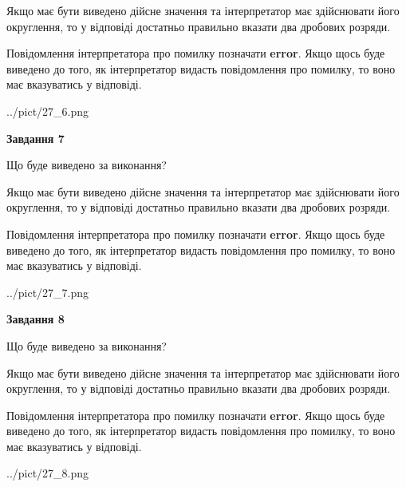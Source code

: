 \documentclass[12pt, ukrainian]{article}
\begin{document}
{\begin {Large}
Якщо має бути виведено дійсне значення та інтерпретатор має здійснювати його округлення, 
то у відповіді достатньо правильно вказати два дробових розряди.

Повідомлення інтерпретатора про помилку позначати \textbf{error}.
Якщо щось буде виведено до того, як інтерпретатор видасть повідомлення про помилку, 
то воно має вказуватись у відповіді. \par

\begin{center}
	{../pict/27_6.png}
\end{center}
\newpage

{\begin {center}\textbf{Завдання 7}\end {center}}\par
Що буде виведено за виконання? \par

Якщо має бути виведено дійсне значення та інтерпретатор має здійснювати його округлення, 
то у відповіді достатньо правильно вказати два дробових розряди.

Повідомлення інтерпретатора про помилку позначати \textbf{error}.
Якщо щось буде виведено до того, як інтерпретатор видасть повідомлення про помилку, 
то воно має вказуватись у відповіді. \par

\begin{center}
	{../pict/27_7.png}
\end{center}
\newpage

{\begin {center}\textbf{Завдання 8}\end {center}}\par
Що буде виведено за виконання? \par

Якщо має бути виведено дійсне значення та інтерпретатор має здійснювати його округлення, 
то у відповіді достатньо правильно вказати два дробових розряди.

Повідомлення інтерпретатора про помилку позначати \textbf{error}.
Якщо щось буде виведено до того, як інтерпретатор видасть повідомлення про помилку, 
то воно має вказуватись у відповіді. \par

\begin{center}
	{../pict/27_8.png}
\end{center}
\newpage


\end{Large}}
\end{document}

